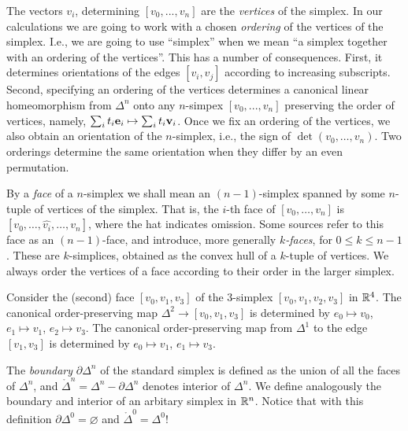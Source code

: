 \documentclass[11pt,a4paper]{report}
\begin{document}
		      
		      
		      The vectors $v_i$, determining  $ [v_0,... , v_n] $
		      are the \emph{vertices} of the simplex.
		      In our calculations we are going to work with a chosen \emph{ordering} of the vertices of the simplex. I.e., 
		      we are going to use  ``simplex'' when we  mean ``a simplex together with an ordering of the vertices''.
		      This has a number of consequences. First, it
              determines orientations of the edges $[v_i, v_j]$ according to increasing subscripts.
              Second, specifying an ordering of the vertices  determines
              a canonical linear homeomorphism from   
              $\Delta^n$ onto any $n$-simpex $ [v_0,... , v_n] $ preserving 
              the order of vertices, namely,
              $\sum_i t_i{\bf e}_i\mapsto \sum_i t_i {\bf v}_i$.
	      Once we fix an ordering of the vertices, we also obtain  an orientation of the $n$-simplex, i.e., the sign of
	      $\det(v_0,\ldots,v_n)$. Two orderings determine the same orientation when they differ by an even permutation.
	      
	      By a \emph{face} of a $n$-simplex we shall mean an $(n-1)$-simplex spanned by some $n$-tuple of vertices of the simplex. That is,
	      the $i$-th face of $[v_0,\ldots,v_n]$ is
	       $[v_0,\ldots,\widehat{v_i},\ldots,v_n]$, where the hat indicates omission. Some sources refer to this face as an
	       $(n-1)$-face, and introduce, more generally  \emph{$k$-faces}, for $0\leq k\leq n-1$. These are $k$-simplices, obtained as
	       the convex hull of  a $k$-tuple of vertices. We always order the vertices of a face according to their order
	       in the larger simplex.
	       
	       \begin{Ex}
	       	Consider the (second) face $[v_0,v_1,v_3]$ of the $3$-simplex $[v_0,v_1,v_2,v_3]$ in $\mathbb{R}^4$. The canonical order-preserving map
	       	$\Delta^2\to [v_0,v_1,v_3]$ is determined by $e_0\mapsto v_0$, $e_1\mapsto v_1$, $e_2\mapsto v_3$. The canonical order-preserving
	       	map from $\Delta^1$ to the edge $[v_1,v_3]$ is determined by $e_0\mapsto v_1$, $e_1\mapsto v_3$.
	       \end{Ex}

	      
		      
		     
                    
             The \emph{boundary} $\partial\Delta^n$ of the standard simplex is defined as the union of all the faces of $\Delta^n$, and
             $\mathring{\Delta}^n = \Delta^n - \partial\Delta^n $ denotes interior of $\Delta^n$. We define analogously the boundary and
             interior of an arbitary simplex in $\mathbb{R}^n$.
             Notice that with this definition  $\partial \Delta^0=\varnothing$ and $\mathring{\Delta}^0= \Delta^0$!
             
\end{document}
